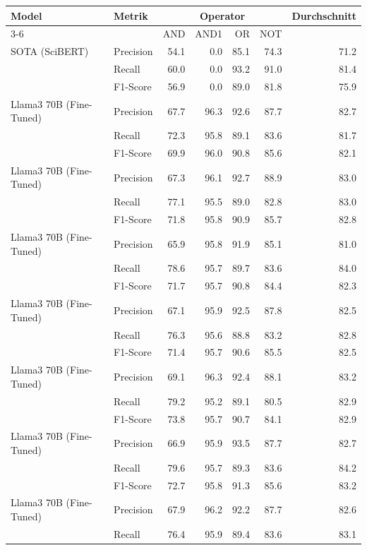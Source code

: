 \begin{table}[!ht]
\centering
\small
\begin{tabular}{llrrrrr}
\toprule
\textbf{Model} & \textbf{Metrik} & \multicolumn{4}{c}{\textbf{Operator}} & \textbf{Durchschnitt} \\
\cmidrule(lr){3-6}
& & AND & AND1 & OR & NOT & \\
\midrule
SOTA
(SciBERT) & Precision & 54.1 & 0.0 & 85.1 & 74.3 & 71.2 \\
 & Recall & 60.0 & 0.0 & 93.2 & 91.0 & 81.4 \\
 & F1-Score & 56.9 & 0.0 & 89.0 & 81.8 & 75.9 \\
\midrule
Llama3 70B
(Fine-Tuned) & Precision & 67.7 & 96.3 & 92.6 & 87.7 & 82.7 \\
 & Recall & 72.3 & 95.8 & 89.1 & 83.6 & 81.7 \\
 & F1-Score & 69.9 & 96.0 & 90.8 & 85.6 & 82.1 \\
\midrule
Llama3 70B
(Fine-Tuned) & Precision & 67.3 & 96.1 & 92.7 & 88.9 & 83.0 \\
 & Recall & 77.1 & 95.5 & 89.0 & 82.8 & 83.0 \\
 & F1-Score & 71.8 & 95.8 & 90.9 & 85.7 & 82.8 \\
\midrule
Llama3 70B
(Fine-Tuned) & Precision & 65.9 & 95.8 & 91.9 & 85.1 & 81.0 \\
 & Recall & 78.6 & 95.7 & 89.7 & 83.6 & 84.0 \\
 & F1-Score & 71.7 & 95.7 & 90.8 & 84.4 & 82.3 \\
\midrule
Llama3 70B
(Fine-Tuned) & Precision & 67.1 & 95.9 & 92.5 & 87.8 & 82.5 \\
 & Recall & 76.3 & 95.6 & 88.8 & 83.2 & 82.8 \\
 & F1-Score & 71.4 & 95.7 & 90.6 & 85.5 & 82.5 \\
\midrule
Llama3 70B
(Fine-Tuned) & Precision & 69.1 & 96.3 & 92.4 & 88.1 & 83.2 \\
 & Recall & 79.2 & 95.2 & 89.1 & 80.5 & 82.9 \\
 & F1-Score & 73.8 & 95.7 & 90.7 & 84.1 & 82.9 \\
\midrule
Llama3 70B
(Fine-Tuned) & Precision & 66.9 & 95.9 & 93.5 & 87.7 & 82.7 \\
 & Recall & 79.6 & 95.7 & 89.3 & 83.6 & 84.2 \\
 & F1-Score & 72.7 & 95.8 & 91.3 & 85.6 & 83.2 \\
\midrule
Llama3 70B
(Fine-Tuned) & Precision & 67.9 & 96.2 & 92.2 & 87.7 & 82.6 \\
 & Recall & 76.4 & 95.9 & 89.4 & 83.6 & 83.1 \\

\end{tabular}
\end{table}
